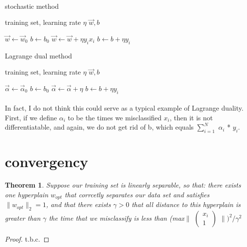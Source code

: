 \documentclass{article}
\newtheorem{theorem}{Theorem}
\newtheorem{proof}{Proof}[section]
\begin{document}
  \paragraph{}
  \begin{algorithm}
    \caption{stochastic method}
    \hspace*{0.02in}{\bf Input:} training set, learning rate $\eta$
    \hspace*{0.02in}{\bf Output:} $\vec w, b$
    \begin{algorithmic}[1]
      \State $\vec w \gets \vec w_0$
      \State $b \gets b_0$
        \State $\vec w \gets \vec w + \eta y_ix_i$
        \State $b \gets b + \eta y_i$
      \EndWhile
    \end{algorithmic}
  \end{algorithm}
  \begin{algorithm}
    \caption{Lagrange dual method}
    \hspace*{0.02in}{\bf Input:} training set, learning rate $\eta$
    \hspace*{0.02in}{\bf Output:} $\vec w, b$
    \begin{algorithmic}[1]
      \State $\vec \alpha \gets \vec \alpha_0$
      \State $b \gets b_0$
        \State $\vec \alpha \gets \vec \alpha + \eta$
        \State $b \gets b + \eta y_i$
      \EndWhile
    \end{algorithmic}
  \end{algorithm}
  \paragraph{}
  In fact, I do not think this could serve as a typical example of Lagrange duality. First, if we define $\alpha_i$ to be the times we misclassified $x_i$, then it is not differentiatable, and again, we do not get rid of b, which equals $\sum_{i = 1}^{N}$ $\alpha_i$ * $y_i$.

\section{convergency}
  \begin{theorem}
    Suppose our training set is linearly separable, so that:
    \newline
      there exists one hyperplain $w_{opt}$ that corrcetly separates our data set and satisfies $\|w_{opt}\|_2 = 1$, and that there exists $\gamma > 0$ that all distance to this hyperplain is greater than $\gamma$
    \newline
      the time that we misclassify is less than (max$\|$
          $\left(
            \begin{array}{c}
              x_i\\
              1
            \end{array}
          \right)$
      $\|)^2 / \gamma^2$
    \end{theorem}
    \begin{proof}
      t.b.c.
    \end{proof}
\end{document}
